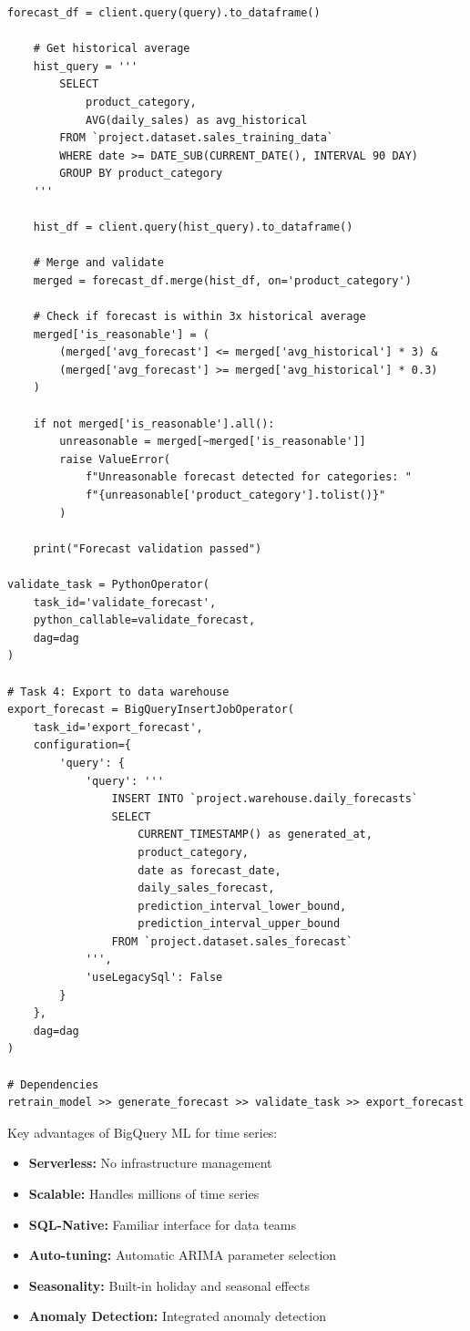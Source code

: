 \begin{lstlisting}[style=python, caption=Production BigQuery ML Pipeline]
    forecast_df = client.query(query).to_dataframe()

    # Get historical average
    hist_query = '''
        SELECT
            product_category,
            AVG(daily_sales) as avg_historical
        FROM `project.dataset.sales_training_data`
        WHERE date >= DATE_SUB(CURRENT_DATE(), INTERVAL 90 DAY)
        GROUP BY product_category
    '''

    hist_df = client.query(hist_query).to_dataframe()

    # Merge and validate
    merged = forecast_df.merge(hist_df, on='product_category')

    # Check if forecast is within 3x historical average
    merged['is_reasonable'] = (
        (merged['avg_forecast'] <= merged['avg_historical'] * 3) &
        (merged['avg_forecast'] >= merged['avg_historical'] * 0.3)
    )

    if not merged['is_reasonable'].all():
        unreasonable = merged[~merged['is_reasonable']]
        raise ValueError(
            f"Unreasonable forecast detected for categories: "
            f"{unreasonable['product_category'].tolist()}"
        )

    print("Forecast validation passed")

validate_task = PythonOperator(
    task_id='validate_forecast',
    python_callable=validate_forecast,
    dag=dag
)

# Task 4: Export to data warehouse
export_forecast = BigQueryInsertJobOperator(
    task_id='export_forecast',
    configuration={
        'query': {
            'query': '''
                INSERT INTO `project.warehouse.daily_forecasts`
                SELECT
                    CURRENT_TIMESTAMP() as generated_at,
                    product_category,
                    date as forecast_date,
                    daily_sales_forecast,
                    prediction_interval_lower_bound,
                    prediction_interval_upper_bound
                FROM `project.dataset.sales_forecast`
            ''',
            'useLegacySql': False
        }
    },
    dag=dag
)

# Dependencies
retrain_model >> generate_forecast >> validate_task >> export_forecast
\end{lstlisting}

Key advantages of BigQuery ML for time series:
\begin{itemize}
    \item \textbf{Serverless:} No infrastructure management
    \item \textbf{Scalable:} Handles millions of time series
    \item \textbf{SQL-Native:} Familiar interface for data teams
    \item \textbf{Auto-tuning:} Automatic ARIMA parameter selection
    \item \textbf{Seasonality:} Built-in holiday and seasonal effects
    \item \textbf{Anomaly Detection:} Integrated anomaly detection
\end{itemize}

